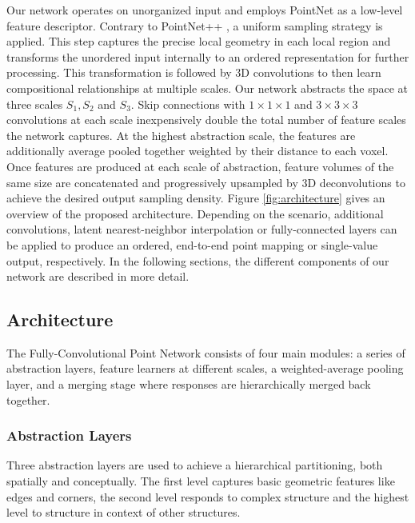\documentclass[runningheads]{llncs}
\begin{document}
\noindent
Our network operates on unorganized input and employs PointNet \cite{Qi2017} as a low-level feature descriptor. Contrary to PointNet++ \cite{Qi2017_2}, a uniform sampling strategy is applied. This step captures the precise local geometry in each local region and transforms the unordered input internally to an ordered representation for further processing. This transformation is followed by 3D convolutions to then learn compositional relationships at multiple scales. Our network abstracts the space at three scales $S_1, S_2$ and $S_3$. Skip connections with $1\times 1\times 1$ and $3\times 3\times 3$ convolutions at each scale inexpensively double the total number of feature scales the network captures. At the highest abstraction scale, the features are additionally average pooled together weighted by their distance to each voxel. Once features are produced at each scale of abstraction, feature volumes of the same size are concatenated and progressively upsampled by 3D deconvolutions to achieve the desired output sampling density. Figure \ref{fig:architecture} gives an overview of the proposed architecture. Depending on the scenario, additional convolutions, latent nearest-neighbor interpolation or fully-connected layers can be applied to produce an ordered, end-to-end point mapping or single-value output, respectively. In the following sections, the different components of our network are described in more detail.\\

\subsection{Architecture}

The Fully-Convolutional Point Network consists of four main modules: a series of abstraction layers, feature learners at different scales, a weighted-average pooling layer, and a merging stage where responses are hierarchically merged back together.

\subsubsection{Abstraction Layers}
Three abstraction layers are used to achieve a hierarchical partitioning, both spatially and conceptually. The first level captures basic geometric features like edges and corners, the second level responds to complex structure and the highest level to structure in context of other structures.\\
\end{document}
